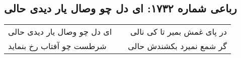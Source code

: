 \begin{center}
\section*{رباعی شماره ۱۷۳۲: ای دل چو وصال یار دیدی حالی}
\label{sec:1732}
\begin{longtable}{l p{0.5cm} r}
ای دل چو وصال یار دیدی حالی
&&
در پای غمش بمیر تا کی نالی
\\
شرطست چو آفتاب رخ بنماید
&&
گر شمع نمیرد بکشندش حالی
\\
\end{longtable}
\end{center}
